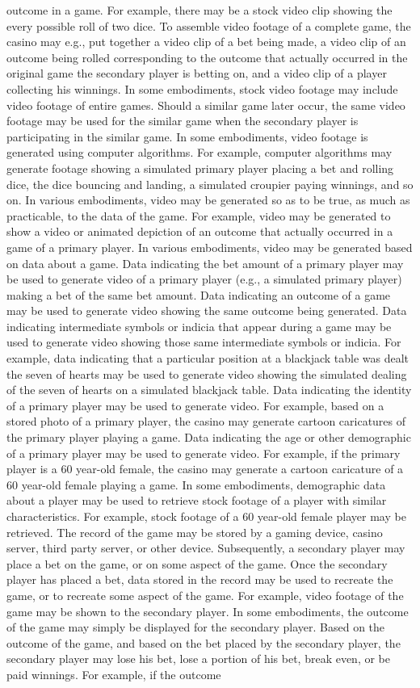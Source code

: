 \documentclass[11pt,a4paper]{article}
\begin{document}
outcome in a game. For example, there may be a stock video clip showing the every possible roll of two dice. To assemble video footage of a complete game, the casino may e.g., put together a video clip of a bet being made, a video clip of an outcome being rolled corresponding to the outcome that actually occurred in the original game the secondary player is betting on, and a video clip of a player collecting his winnings. In some embodiments, stock video footage may include video footage of entire games. Should a similar game later occur, the same video footage may be used for the similar game when the secondary player is participating in the similar game. In some embodiments, video footage is generated using computer algorithms. For example, computer algorithms may generate footage showing a simulated primary player placing a bet and rolling dice, the dice bouncing and landing, a simulated croupier paying winnings, and so on. In various embodiments, video may be generated so as to be true, as much as practicable, to the data of the game. For example, video may be generated to show a video or animated depiction of an outcome that actually occurred in a game of a primary player. In various embodiments, video may be generated based on data about a game. Data indicating the bet amount of a primary player may be used to generate video of a primary player (e.g., a simulated primary player) making a bet of the same bet amount. Data indicating an outcome of a game may be used to generate video showing the same outcome being generated. Data indicating intermediate symbols or indicia that appear during a game may be used to generate video showing those same intermediate symbols or indicia. For example, data indicating that a particular position at a blackjack table was dealt the seven of hearts may be used to generate video showing the simulated dealing of the seven of hearts on a simulated blackjack table. Data indicating the identity of a primary player may be used to generate video. For example, based on a stored photo of a primary player, the casino may generate cartoon caricatures of the primary player playing a game. Data indicating the age or other demographic of a primary player may be used to generate video. For example, if the primary player is a 60 year-old female, the casino may generate a cartoon caricature of a 60 year-old female playing a game. In some embodiments, demographic data about a player may be used to retrieve stock footage of a player with similar characteristics. For example, stock footage of a 60 year-old female player may be retrieved. The record of the game may be stored by a gaming device, casino server, third party server, or other device. Subsequently, a secondary player may place a bet on the game, or on some aspect of the game. Once the secondary player has placed a bet, data stored in the record may be used to recreate the game, or to recreate some aspect of the game. For example, video footage of the game may be shown to the secondary player. In some embodiments, the outcome of the game may simply be displayed for the secondary player. Based on the outcome of the game, and based on the bet placed by the secondary player, the secondary player may lose his bet, lose a portion of his bet, break even, or be paid winnings. For example, if the outcome 
\end{document}
